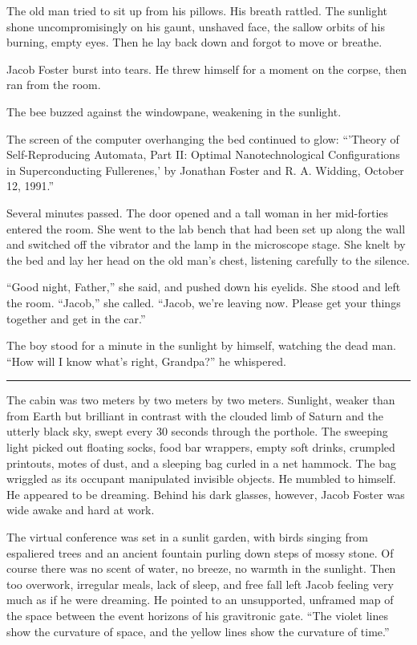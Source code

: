\documentclass[english,11pt,letterpaper,onecolumn]{scrbook}
\begin{document}
	The old man tried to sit up from his pillows.  His breath rattled.  The sunlight shone uncompromisingly on his gaunt, unshaved face, the sallow orbits of his burning, empty eyes.  Then he lay back down and forgot to move or breathe.

	Jacob Foster burst into tears.  He threw himself for a moment on the corpse, then ran from the room.

	The bee buzzed against the windowpane, weakening in the sunlight.

	The screen of the computer overhanging the bed continued to glow:  ``'Theory of Self-Reproducing Automata, Part II:  Optimal Nanotechnological Configurations in Superconducting Fullerenes,' by Jonathan Foster and R. A. Widding, October 12, 1991.''

	Several minutes passed.  The door opened and a tall woman in her mid-forties entered the room.  She went to the lab bench that had been set up along the wall and switched off the vibrator and the lamp in the microscope stage.  She knelt by the bed and lay her head on the old man's chest, listening carefully to the silence.

	``Good night, Father,'' she said, and pushed down his eyelids.  She stood and left the room.  ``Jacob,'' she called.  ``Jacob, we're leaving now.  Please get your things together and get in the car.''

	The boy stood for a minute in the sunlight by himself, watching the dead man.  ``How will I know what's right, Grandpa?'' he whispered.

\begin{center}\rule[3pt]{2in}{0.5pt}\end{center}

	The cabin was two meters by two meters by two meters.  Sunlight, weaker than from Earth but brilliant in contrast with the clouded limb of Saturn and the utterly black sky, swept every 30 seconds through the porthole.  The sweeping light picked out floating socks, food bar wrappers, empty soft drinks, crumpled printouts, motes of dust, and a sleeping bag curled in a net hammock.  
	The bag wriggled as its occupant manipulated invisible objects.  He mumbled to himself.  He appeared to be dreaming.  Behind his dark glasses, however, Jacob Foster was wide awake and hard at work.

	The virtual conference was set in a sunlit garden, with birds singing from espaliered trees and an ancient fountain purling down steps of mossy stone.  Of course there was no scent of water, no breeze, no warmth in the sunlight.  Then too overwork, irregular meals, lack of sleep, and free fall left Jacob feeling very much as if he were dreaming.  He pointed to an unsupported, unframed map of the space between the event horizons of his gravitronic gate. ``The violet lines show the curvature of space, and the yellow lines show the curvature of time.''
\end{document}
